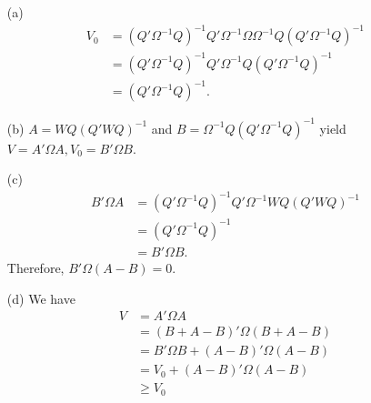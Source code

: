 \documentclass{article}
\begin{document}
\begin{itemize}
    \item[(a) ]
    \begin{align*}
        V_0 &= (Q'\Omega^{-1}Q)^{-1}Q'\Omega^{-1}\Omega\Omega^{-1}Q(Q'\Omega^{-1}Q)^{-1} \\
        &= (Q'\Omega^{-1}Q)^{-1}Q'\Omega^{-1}Q(Q'\Omega^{-1}Q)^{-1} \\
        & = (Q'\Omega^{-1}Q)^{-1}.
    \end{align*}

    \item[(b) ]
    $A = WQ(Q'WQ)^{-1}$ and $B = \Omega^{-1}Q(Q'\Omega^{-1}Q)^{-1}$ yield $V = A'\Omega A, V_0 = B'\Omega B$.

    \item[(c) ]
    \begin{align*}
        B'\Omega A &= (Q'\Omega^{-1}Q)^{-1}Q'\Omega^{-1}WQ(Q'WQ)^{-1} \\
        &= (Q'\Omega^{-1}Q)^{-1}\\
        &= B'\Omega B.
    \end{align*}
    Therefore, $B'\Omega(A - B) = 0$.

    \item[(d) ]
    We have
    \begin{align*}
        V &= A'\Omega A \\ 
        &= (B + A - B)'\Omega(B + A - B) \\
        &= B'\Omega B + (A - B)'\Omega(A - B) \\
        &= V_0 + (A - B)'\Omega(A - B) \\
        &\geq V_0 
    \end{align*}
\end{itemize}




\end{document}
